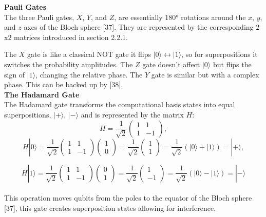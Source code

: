 \noindent\textbf{Pauli Gates}\\ 
\noindent The three Pauli gates, $X$, $Y$, and $Z$, are essentially 180° rotations around the $x$, $y$, and $z$ axes of the Bloch sphere [37]. They are represented by the corresponding $2$x$2$ matrices introduced in section 2.2.1.

\noindent The $X$ gate is like a classical NOT gate it flips $|0\rangle \leftrightarrow |1\rangle$, so for superpositions it switches the probability amplitudes. The $Z$ gate doesn't affect $|0\rangle$ but flips the sign of $|1\rangle$, changing the relative phase. The $Y$ gate is similar but with a complex phase. This can be backed up by [38]. \\

\noindent\textbf{The Hadamard Gate}\\
\noindent The Hadamard gate transforms the computational basis states into equal superpositions, $|+\rangle$, $|-\rangle$ and is represented by the matrix $H$:
\[
H = \frac{1}{\sqrt{2}} \begin{pmatrix} 1 & 1 \\ 1 & -1 \end{pmatrix},
\]
\[
H|0\rangle = \frac{1}{\sqrt{2}}
\begin{pmatrix}
1 & 1 \\
1 & -1
\end{pmatrix}
\begin{pmatrix}
1 \\
0
\end{pmatrix}
= \frac{1}{\sqrt{2}}
\begin{pmatrix}
1 \\
1
\end{pmatrix}
= \frac{1}{\sqrt{2}}(|0\rangle + |1\rangle)=|+\rangle,
\]

\[
H|1\rangle = \frac{1}{\sqrt{2}}
\begin{pmatrix}
1 & 1 \\
1 & -1
\end{pmatrix}
\begin{pmatrix}
0 \\
1
\end{pmatrix}
= \frac{1}{\sqrt{2}}
\begin{pmatrix}
1 \\
-1
\end{pmatrix}
= \frac{1}{\sqrt{2}}(|0\rangle - |1\rangle)=|-\rangle
\]\\
\noindent This operation moves qubits from the poles to the equator of the Bloch sphere [37], this gate creates superposition states allowing for interference.

